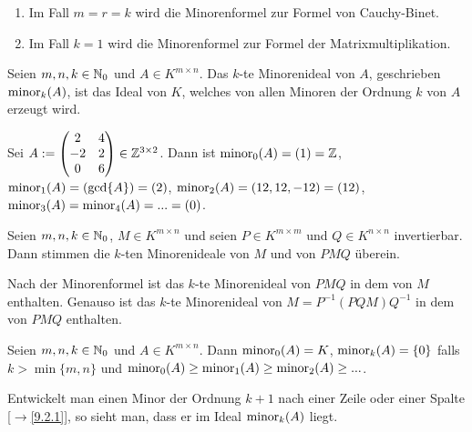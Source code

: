 \documentclass[../../main.tex]{subfiles}
\begin{document}
\begin{bem}\label{17.2.9}
\begin{enumerate}[\normalfont(a)]
\item Im Fall $m=r=k$ wird die Minorenformel zur Formel von Cauchy-Binet.
\item Im Fall $k=1$ wird die Minorenformel zur Formel der Matrixmultiplikation.
\end{enumerate}
\end{bem}

\begin{df}\label{17.2.10}
Seien $m,n,k\in \mathbb N_0$ und $A\in K^{m\times n}$. Das $k$-te Minorenideal von $A$, geschrieben $\operatorname{minor}_k(A)$, ist das Ideal von $K$, welches von allen Minoren der Ordnung $k$ von $A$ erzeugt wird.
\end{df}

\begin{bsp}\label{17.2.11}
Sei $A:=\begin{pmatrix}2&4\\-2&2\\0&6\end{pmatrix}\in \mathbb Z^{3\times 2}$. Dann ist $\operatorname{minor}_0(A)=(1)=\mathbb Z$, $\operatorname{minor}_1(A)=(\gcd\{A\})=(2)$, $\operatorname{minor}_2(A)=(12,12,-12)=(12)$, $\operatorname{minor}_3(A)=\operatorname{minor}_4(A)=...=(0)$.
\end{bsp}

\begin{kor}\label{17.2.12}
Seien $m,n,k\in\mathbb N_0$, $M\in K^{m\times n}$ und seien $P\in K^{m\times m}$ und $Q\in K^{n\times n}$ invertierbar. Dann stimmen die $k$-ten Minorenideale von $M$ und von $PMQ$ überein. 
\end{kor}
\begin{cproof}
Nach der Minorenformel ist das $k$-te Minorenideal von $PMQ$ in dem von $M$ enthalten. Genauso ist das $k$-te Minorenideal von $M=P^{-1}(PQM)Q^{-1}$ in dem von $PMQ$ enthalten.
\end{cproof}

\begin{pro}\label{17.2.13}
Seien $m,n,k\in\mathbb N_0$ und $A\in K^{m\times n}$. Dann $\operatorname{minor}_0(A)=K$, $\operatorname{minor}_k(A)=\{0\}$ falls $k>\min\{m,n\}$ und $\operatorname{minor}_0(A)\ge \operatorname{minor}_1(A)\ge\operatorname{minor}_2(A)\ge...$.
\end{pro}
\begin{cproof}
Entwickelt man einen Minor der Ordnung $k+1$ nach einer Zeile oder einer Spalte [$\to$\ref{9.2.1}], so sieht man, dass er im Ideal $\operatorname{minor}_k(A)$ liegt.
\end{cproof}
\end{document}
